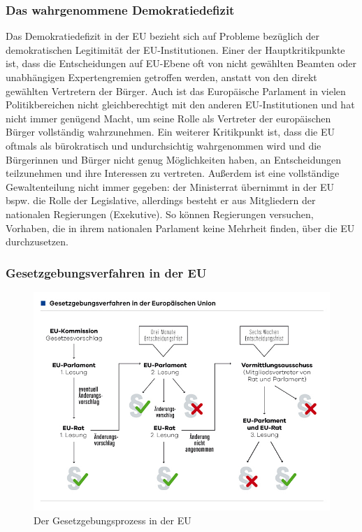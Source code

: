 \documentclass{article}
\begin{document}
	\subsubsection{Das wahrgenommene Demokratiedefizit}
	Das Demokratiedefizit in der EU bezieht sich auf Probleme bezüglich der demokratischen Legitimität der EU-Institutionen. Einer der Hauptkritikpunkte ist, dass die Entscheidungen auf EU-Ebene oft von nicht gewählten Beamten oder unabhängigen Expertengremien getroffen werden, anstatt von den direkt gewählten Vertretern der Bürger. Auch ist das Europäische Parlament in vielen Politikbereichen nicht gleichberechtigt mit den anderen EU-Institutionen und hat nicht immer genügend Macht, um seine Rolle als Vertreter der europäischen Bürger vollständig wahrzunehmen. Ein weiterer Kritikpunkt ist, dass die EU oftmals als bürokratisch und undurchsichtig wahrgenommen wird und die Bürgerinnen und Bürger nicht genug Möglichkeiten haben, an Entscheidungen teilzunehmen und ihre Interessen zu vertreten. Außerdem ist eine vollständige Gewaltenteilung nicht immer gegeben: der Ministerrat übernimmt in der EU bspw. die Rolle der Legislative, allerdings besteht er aus Mitgliedern der nationalen Regierungen (Exekutive). So können Regierungen versuchen, Vorhaben, die in ihrem nationalen Parlament keine Mehrheit finden, über die EU durchzusetzen.

	\subsubsection{Gesetzgebungsverfahren in der EU}

	\begin{figure}[!ht]
		\centering
  		\includegraphics[width=45em]{eu_gesetzverfahren.jpg}
  		\caption{Der Gesetzgebungsprozess in der EU}
  		\label{fig:eu_gesetzverfahren}
	\end{figure}
\end{document}
